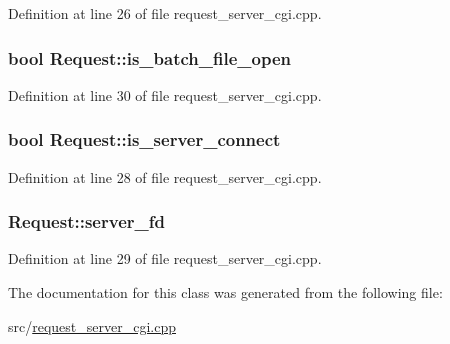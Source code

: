 Definition at line 26 of file request\+\_\+server\+\_\+cgi.\+cpp.

\subsubsection[{\texorpdfstring{is\+\_\+batch\+\_\+file\+\_\+open}{is_batch_file_open}}]{\setlength{\rightskip}{0pt plus 5cm}bool Request\+::is\+\_\+batch\+\_\+file\+\_\+open}\hypertarget{classRequest_a11bea4e83a069abfa16141669b41c717}{}\label{classRequest_a11bea4e83a069abfa16141669b41c717}


Definition at line 30 of file request\+\_\+server\+\_\+cgi.\+cpp.

\subsubsection[{\texorpdfstring{is\+\_\+server\+\_\+connect}{is_server_connect}}]{\setlength{\rightskip}{0pt plus 5cm}bool Request\+::is\+\_\+server\+\_\+connect}\hypertarget{classRequest_a30024722f13af3adb689b49ef2a3e3b7}{}\label{classRequest_a30024722f13af3adb689b49ef2a3e3b7}


Definition at line 28 of file request\+\_\+server\+\_\+cgi.\+cpp.

\subsubsection[{\texorpdfstring{server\+\_\+fd}{server_fd}}]{ Request\+::server\+\_\+fd}\hypertarget{classRequest_a223435a4804fdb654d6dc1a235225dad}{}\label{classRequest_a223435a4804fdb654d6dc1a235225dad}


Definition at line 29 of file request\+\_\+server\+\_\+cgi.\+cpp.



The documentation for this class was generated from the following file\+:\begin{DoxyCompactItemize}
\item 
src/\hyperlink{request__server__cgi_8cpp}{request\+\_\+server\+\_\+cgi.\+cpp}\end{DoxyCompactItemize}
